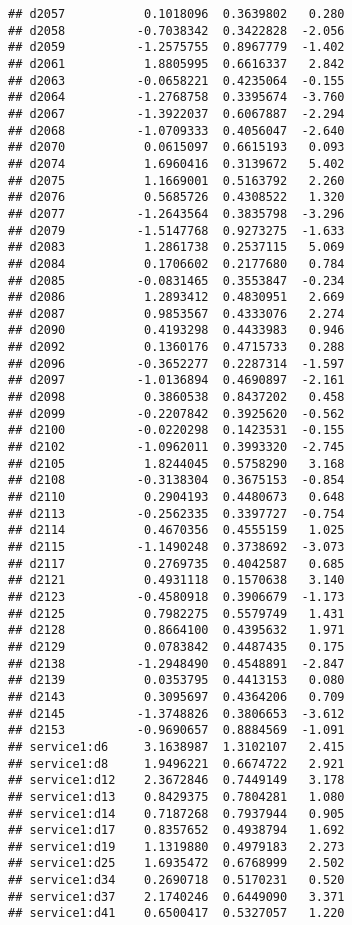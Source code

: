 \documentclass[
]{article}
\begin{document}
\begin{verbatim}
## d2057           0.1018096  0.3639802   0.280
## d2058          -0.7038342  0.3422828  -2.056
## d2059          -1.2575755  0.8967779  -1.402
## d2061           1.8805995  0.6616337   2.842
## d2063          -0.0658221  0.4235064  -0.155
## d2064          -1.2768758  0.3395674  -3.760
## d2067          -1.3922037  0.6067887  -2.294
## d2068          -1.0709333  0.4056047  -2.640
## d2070           0.0615097  0.6615193   0.093
## d2074           1.6960416  0.3139672   5.402
## d2075           1.1669001  0.5163792   2.260
## d2076           0.5685726  0.4308522   1.320
## d2077          -1.2643564  0.3835798  -3.296
## d2079          -1.5147768  0.9273275  -1.633
## d2083           1.2861738  0.2537115   5.069
## d2084           0.1706602  0.2177680   0.784
## d2085          -0.0831465  0.3553847  -0.234
## d2086           1.2893412  0.4830951   2.669
## d2087           0.9853567  0.4333076   2.274
## d2090           0.4193298  0.4433983   0.946
## d2092           0.1360176  0.4715733   0.288
## d2096          -0.3652277  0.2287314  -1.597
## d2097          -1.0136894  0.4690897  -2.161
## d2098           0.3860538  0.8437202   0.458
## d2099          -0.2207842  0.3925620  -0.562
## d2100          -0.0220298  0.1423531  -0.155
## d2102          -1.0962011  0.3993320  -2.745
## d2105           1.8244045  0.5758290   3.168
## d2108          -0.3138304  0.3675153  -0.854
## d2110           0.2904193  0.4480673   0.648
## d2113          -0.2562335  0.3397727  -0.754
## d2114           0.4670356  0.4555159   1.025
## d2115          -1.1490248  0.3738692  -3.073
## d2117           0.2769735  0.4042587   0.685
## d2121           0.4931118  0.1570638   3.140
## d2123          -0.4580918  0.3906679  -1.173
## d2125           0.7982275  0.5579749   1.431
## d2128           0.8664100  0.4395632   1.971
## d2129           0.0783842  0.4487435   0.175
## d2138          -1.2948490  0.4548891  -2.847
## d2139           0.0353795  0.4413153   0.080
## d2143           0.3095697  0.4364206   0.709
## d2145          -1.3748826  0.3806653  -3.612
## d2153          -0.9690657  0.8884569  -1.091
## service1:d6     3.1638987  1.3102107   2.415
## service1:d8     1.9496221  0.6674722   2.921
## service1:d12    2.3672846  0.7449149   3.178
## service1:d13    0.8429375  0.7804281   1.080
## service1:d14    0.7187268  0.7937944   0.905
## service1:d17    0.8357652  0.4938794   1.692
## service1:d19    1.1319880  0.4979183   2.273
## service1:d25    1.6935472  0.6768999   2.502
## service1:d34    0.2690718  0.5170231   0.520
## service1:d37    2.1740246  0.6449090   3.371
## service1:d41    0.6500417  0.5327057   1.220

\end{verbatim}
\end{document}
